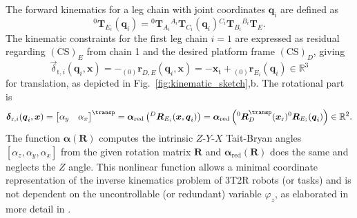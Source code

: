 \documentclass[
	graybox,
	vecphys] %
	{svmult}
\newcommand{\bm}[1]{\boldsymbol{#1}}
\newcommand{\ks}[1]{{(\mathrm{CS})}_{#1}}
\newcommand{\ortvek}[4]{{ }_{(#1)}{\boldsymbol{#2}}^{#3}_{#4} }
\newcommand{\trmat}[2]{{{ }^{#1}\boldsymbol{T}}_{#2}}
\newcommand{\rotmat}[2]{{{ }^{#1}\boldsymbol{R}}_{#2}}
\newcommand{\Res}[0]{\vec{\delta}}
\begin{document}
The forward kinematics for a leg chain with joint coordinates $\bm{q}_i$ are defined as
\begin{equation}
\trmat{0}{E_i}(\bm{q}_i)=\trmat{0}{A_i} \trmat{A_i}{C_i}(\bm{q}_i)  \trmat{C_i}{B_i} \trmat{B_i}{E}.
\label{eq:fkine_leg}
\end{equation}
%
The kinematic constraints for the first leg chain $i{=}1$ are expressed as residual regarding $\ks{E}$ from chain 1 and the desired platform frame $\ks{D}$, giving
\begin{equation}
\Res_{\mathrm{t},i}(\bm{q}_i,\bm{x})
=
- \ortvek{0}{r}{}{D,E}(\bm{q}_i,\bm{x})
=
- \bm{x}_{\mathrm{t}} + \ortvek{0}{r}{}{E_i}(\bm{q}_i) \in {\mathbb{R}}^{3}
\label{eq:phi_trans}
\end{equation}
for translation, as depicted in Fig.~\ref{fig:kinematic_sketch},b.
The rotational part is
\begin{equation}
\Res_{\mathrm{r},i}(\bm{q}_i,\bm{x})
=
\begin{bmatrix}
\alpha_y & \alpha_x
\end{bmatrix}^\transp
=
\bm{\alpha}_\mathrm{red}\left(\rotmat{D}{E_i}(\bm{x},\bm{q}_i)\right)
=
\bm{\alpha}_\mathrm{red}\left(\rotmat{0}{D}^\transp (\bm{x}_{\mathrm{r}})\rotmat{0}{E_i}(\bm{q}_i)\right) \in {\mathbb{R}}^{2}.
\label{eq:phi1_rot}
\end{equation}
The function $\bm{\alpha}(\bm{R})$ computes the intrinsic $Z$-$Y$-$X$ Tait-Bryan angles $[\alpha_z,\alpha_y,\alpha_x]$ from the given rotation matrix $\bm{R}$ and $\bm{\alpha}_\mathrm{red}(\bm{R})$ does the same and neglects the $Z$ angle.
This nonlinear function allows a minimal coordinate representation of the inverse kinematics problem of 3T2R robots (or tasks) and is not dependent on the uncontrollable (or redundant) variable $\varphi_z$, as elaborated in more detail in \cite{SchapplerTapOrt2019}.
\end{document}
